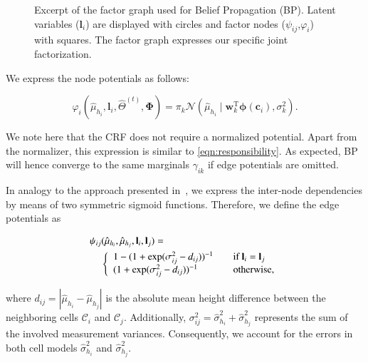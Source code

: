 \begin{figure}[t]
\centering
{}
\caption{Excerpt of the factor graph used for Belief Propagation (BP). Latent
variables ($\mathbf{l}_i$) are displayed with circles and factor nodes
($\psi_{ij}$,$\varphi_i$) with squares. The factor graph expresses our specific
joint factorization.}
\label{fig:fg}
\end{figure}

We express the node potentials as follows:

\begin{equation}
\label{eqn:node_potential}
\varphi_i(\hat{\mu}_{h_i},\mathbf{l}_i,\hat{\Theta}^{(t)},\boldsymbol{\Phi})=
\pi_k\mathcal{N}(\hat{\mu}_{h_i}\mid\mathbf{w}_k^\text{T}
\boldsymbol{\phi}(\mathbf{c}_i),\sigma^2_k).
\end{equation}

We note here that the CRF does not require a normalized potential. Apart from
the normalizer, this expression is similar to \eqref{eqn:responsibility}. As
expected, BP will hence converge to the same marginals $\gamma_{ik}$ if edge
potentials are omitted.

In analogy to the approach presented in~\cite{siegemund10curb}, we express the
inter-node dependencies by means of two symmetric sigmoid functions. Therefore,
we define the edge potentials as

\begin{eqnarray}
\label{eqn:edge_potential}
\psi_{ij}(\hat{\mu}_{h_i},\hat{\mu}_{h_j},\mathbf{l}_i,\mathbf{l}_j)=
\phantom{aaaaaaaaaaaaaaaaaaaaaaa}\\\nonumber
\left\{
\begin{array}{l l}
1-(1+\exp(\sigma^2_{ij}-d_{ij}))^{-1} & \quad
\text{if $\mathbf{l}_i=\mathbf{l}_j$}\\
(1+\exp(\sigma^2_{ij}-d_{ij}))^{-1} & \quad
\text{otherwise},
\end{array} \right.
\end{eqnarray}

where $d_{ij}=|\hat{\mu}_{h_i}-\hat{\mu}_{h_j}|$ is the absolute mean height
difference between the neighboring cells $\mathcal{C}_i$ and $\mathcal{C}_j$.
Additionally, $\sigma^2_{ij}=\hat{\sigma}^2_{h_i}+\hat{\sigma}^2_{h_j}$
represents the sum of the involved measurement variances. Consequently, we
account for the errors in both cell models $\hat{\sigma}^2_{h_i}$ and
$\hat{\sigma}^2_{h_j}$.
